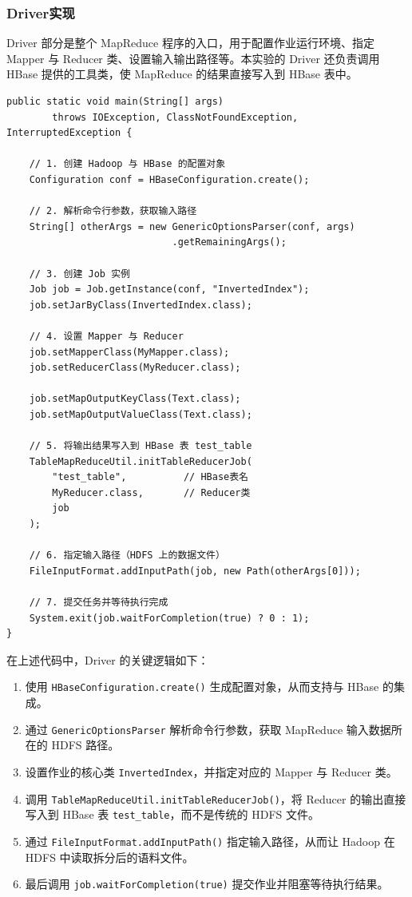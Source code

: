\documentclass[]{bitreport}
\begin{document}
\subsubsection{Driver实现}

Driver 部分是整个 MapReduce 程序的入口，用于配置作业运行环境、指定 Mapper 与 Reducer 类、设置输入输出路径等。本实验的 Driver 还负责调用 HBase 提供的工具类，使 MapReduce 的结果直接写入到 HBase 表中。

\begin{lstlisting}[style=java, caption={Driver核心代码}]
public static void main(String[] args) 
        throws IOException, ClassNotFoundException, InterruptedException {
    
    // 1. 创建 Hadoop 与 HBase 的配置对象
    Configuration conf = HBaseConfiguration.create();
    
    // 2. 解析命令行参数，获取输入路径
    String[] otherArgs = new GenericOptionsParser(conf, args)
                             .getRemainingArgs();
    
    // 3. 创建 Job 实例
    Job job = Job.getInstance(conf, "InvertedIndex");
    job.setJarByClass(InvertedIndex.class);
    
    // 4. 设置 Mapper 与 Reducer
    job.setMapperClass(MyMapper.class);
    job.setReducerClass(MyReducer.class);
    
    job.setMapOutputKeyClass(Text.class);
    job.setMapOutputValueClass(Text.class);
    
    // 5. 将输出结果写入到 HBase 表 test_table
    TableMapReduceUtil.initTableReducerJob(
        "test_table",          // HBase表名
        MyReducer.class,       // Reducer类
        job
    );
    
    // 6. 指定输入路径（HDFS 上的数据文件）
    FileInputFormat.addInputPath(job, new Path(otherArgs[0]));
    
    // 7. 提交任务并等待执行完成
    System.exit(job.waitForCompletion(true) ? 0 : 1);
}
\end{lstlisting}

在上述代码中，Driver 的关键逻辑如下：
\begin{enumerate}
  \item 使用 \texttt{HBaseConfiguration.create()} 生成配置对象，从而支持与 HBase 的集成。
  \item 通过 \texttt{GenericOptionsParser} 解析命令行参数，获取 MapReduce 输入数据所在的 HDFS 路径。
  \item 设置作业的核心类 \texttt{InvertedIndex}，并指定对应的 Mapper 与 Reducer 类。
  \item 调用 \texttt{TableMapReduceUtil.initTableReducerJob()}，将 Reducer 的输出直接写入到 HBase 表 \texttt{test\_table}，而不是传统的 HDFS 文件。
  \item 通过 \texttt{FileInputFormat.addInputPath()} 指定输入路径，从而让 Hadoop 在 HDFS 中读取拆分后的语料文件。
  \item 最后调用 \texttt{job.waitForCompletion(true)} 提交作业并阻塞等待执行结果。
\end{enumerate}
\end{document}
